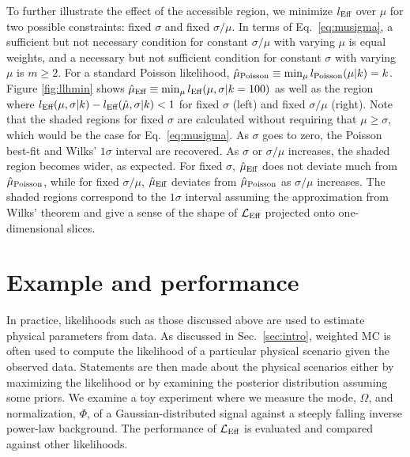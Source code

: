 To further illustrate the effect of the accessible region, we minimize $l_\textmd{Eff}$ over $\mu$ for two possible constraints: fixed $\sigma$ and fixed $\sigma/\mu$. In terms of Eq.~\eqref{eq:musigma}, a sufficient but not necessary condition for constant $\sigma/\mu$ with varying $\mu$ is equal weights, and a necessary but not sufficient condition for constant $\sigma$ with varying $\mu$ is $m \geq 2$. For a standard Poisson likelihood, $\hat{\mu}_\textmd{Poisson}\equiv \min_\mu l_{\textmd{Poisson}}(\mu|k) = k$. Figure \ref{fig:llhmin} shows $\hat{\mu}_\textmd{Eff} \equiv \min_\mu l_\textmd{Eff}(\mu,\sigma|k=100)$ as well as the region where $l_\textmd{Eff}(\mu, \sigma|k) - l_\textmd{Eff}(\hat{\mu}, \sigma|k) < 1$ for fixed $\sigma$ (left) and fixed $\sigma/\mu$ (right). Note that the shaded regions for fixed $\sigma$ are calculated without requiring that $\mu \geq \sigma$, which would be the case for Eq.~\eqref{eq:musigma}. As $\sigma$ goes to zero, the Poisson best-fit and Wilks' $1\sigma$ interval are recovered. As $\sigma$ or $\sigma/\mu$ increases, the shaded region becomes wider, as expected. For fixed $\sigma$, $\hat{\mu}_\textmd{Eff}$ does not deviate much from $\hat{\mu}_\textmd{Poisson}$, while for fixed $\sigma/\mu$, $\hat{\mu}_\textmd{Eff}$ deviates from $\hat{\mu}_\textmd{Poisson}$ as $\sigma/\mu$ increases. The shaded regions correspond to the $1\sigma$ interval assuming the approximation from Wilks' theorem and give a sense of the shape of $\mathcal{L}_\textmd{Eff}$ projected onto one-dimensional slices.

\section{Example and performance}\label{sec:example}

In practice, likelihoods such as those discussed above are used to estimate physical parameters from data. As discussed in Sec.~\ref{sec:intro}, weighted MC is often used to compute the likelihood of a particular physical scenario given the observed data. Statements are then made about the physical scenarios either by maximizing the likelihood or by examining the posterior distribution assuming some priors. We examine a toy experiment where we measure the mode, $\Omega$, and normalization, $\Phi$, of a Gaussian-distributed signal against a steeply falling inverse power-law background. The performance of $\mathcal{L}_\textmd{Eff}$ is evaluated and compared against other likelihoods.

